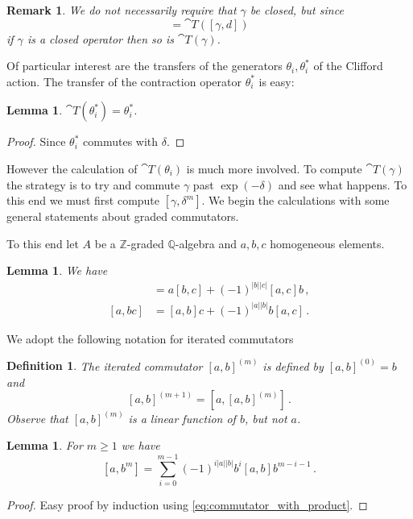 \documentclass[english,letter paper,12pt,leqno]{article}
\newtheorem{lemma}[theorem]{Lemma}
\theoremstyle{example}
\newtheorem{definition}[theorem]{Definition}
\newtheorem{remark}[theorem]{Remark}
\numberwithin{equation}{section}
\def\be{\begin{equation}}
\def\ee{\end{equation}}
\def\nZ{\mathds{Z}}
\def\nQ{\mathds{Q}}
\begin{document}
\begin{remark} We do not necessarily require that $\gamma$ be closed, but since
\be
[\cat{T}(\gamma), d_K + d] = \cat{T}( [\gamma, d] )
\ee
if $\gamma$ is a closed operator then so is $\cat{T}(\gamma)$. 
\end{remark}

Of particular interest are the transfers of the generators $\theta_i, \theta_i^*$ of the Clifford action. The transfer of the contraction operator $\theta_i^*$ is easy:

\begin{lemma} $\cat{T}(\theta_i^*) = \theta_i^*$.
\end{lemma}
\begin{proof}
Since $\theta_i^*$ commutes with $\delta$.
\end{proof}

However the calculation of $\cat{T}(\theta_i)$ is much more involved. To compute $\cat{T}(\gamma)$ the strategy is to try and commute $\gamma$ past $\exp(-\delta)$ and see what happens. To this end we must first compute $[\gamma, \delta^m]$. We begin the calculations with some general statements about graded commutators. 

To this end let $A$ be a $\nZ$-graded $\nQ$-algebra and $a,b,c$ homogeneous elements.

\begin{lemma} We have
\begin{align}
[ab,c] &= a[b,c] + (-1)^{|b||c|} [a,c]b\,,\\
[a,bc] &= [a,b]c + (-1)^{|a||b|} b[a,c]\,. \label{eq:commutator_with_product}
\end{align}
\end{lemma}

We adopt the following notation for iterated commutators

\begin{definition} The iterated commutator $[a,b]^{(m)}$ is defined by $[a,b]^{(0)} = b$ and
\[
[a,b]^{(m+1)} = [a, [a,b]^{(m)}]\,.
\]
Observe that $[a,b]^{(m)}$ is a linear function of $b$, but not $a$.
\end{definition}

\begin{lemma}\label{lemma:woop3} For $m \ge 1$ we have
\[
[a,b^m] = \sum_{i=0}^{m-1} (-1)^{i|a||b|} b^i [a,b] b^{m-i-1}\,.
\]
\end{lemma}
\begin{proof}
Easy proof by induction using \eqref{eq:commutator_with_product}.
\end{proof}
\end{document}
